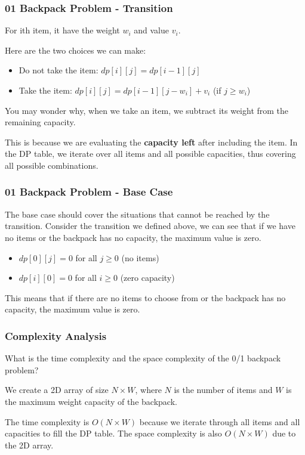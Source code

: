 \documentclass[xcolor=dvipsnames]{beamer}
\begin{document}
    \begin{frame}
        \frametitle{01 Backpack Problem - Transition}
        For ith item, it have the weight $w_i$ and value $v_i$.

        Here are the two choices we can make:
        \begin{itemize}
            \item Do not take the item: $dp[i][j] = dp[i-1][j]$
            \item Take the item: $dp[i][j] = dp[i-1][j-w_i] + v_i$ (if $j \geq w_i$)
        \end{itemize}
        You may wonder why, when we take an item, 
        we subtract its weight from the remaining capacity.

        This is because we are evaluating the \textbf{capacity left} 
        after including the item. In the DP table, 
        we iterate over all items and all possible capacities, 
        thus covering all possible combinations.
    \end{frame}
    \begin{frame}
        \frametitle{01 Backpack Problem - Base Case}
        The base case should cover the situations that cannot be reached by the transition. Consider the transition we defined above,
        we can see that if we have no items or the backpack has no capacity, the maximum value is zero.

        \begin{itemize}
            \item $dp[0][j] = 0$ for all $j \geq 0$ (no items)
            \item $dp[i][0] = 0$ for all $i \geq 0$ (zero capacity)
        \end{itemize}
        This means that if there are no items to choose from or the backpack has no capacity,
        the maximum value is zero.
    \end{frame}
    \begin{frame}
        \frametitle{Complexity Analysis}
        What is the time complexity and the space complexity of the 0/1 backpack problem?
        
        We create a 2D array of size $N \times W$, where $N$ is the number of items and $W$ is the maximum weight capacity of the backpack.

        The time complexity is $O(N \times W)$ because we iterate through all items and all capacities to fill the DP table.
        The space complexity is also $O(N \times W)$ due to the 2D array.
    \end{frame}
\end{document}
